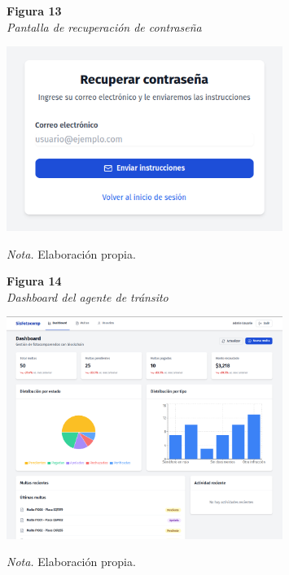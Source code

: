 \documentclass[
    letterpaper, 
    man,   
    spanish,
    12pt,
    donotrepeattitle,
    floatsintext,
    hidelinks %
]{apa7}
\begin{document}
\begin{figure}[htbp]
    \begin{flushleft}
        \textbf{Figura 13}\\
        \textit{Pantalla de recuperación de contraseña}
    \end{flushleft}
    \centering
    \includegraphics[width=0.8\textwidth]{Images/UI2.png}
    \vspace{0.5em}
    \begin{flushleft}
        \textit{Nota.} Elaboración propia.
    \end{flushleft}
    \label{fig:recuperar_password}
\end{figure}

\begin{figure}[htbp]
    \begin{flushleft}
        \textbf{Figura 14}\\
        \textit{Dashboard del agente de tránsito}
    \end{flushleft}
    \centering
    \includegraphics[width=0.8\textwidth]{Images/UI3.png}
    \vspace{0.5em}
    \begin{flushleft}
        \textit{Nota.} Elaboración propia.
    \end{flushleft}
    \label{fig:dashboard_agente}
\end{figure}
\end{document}
